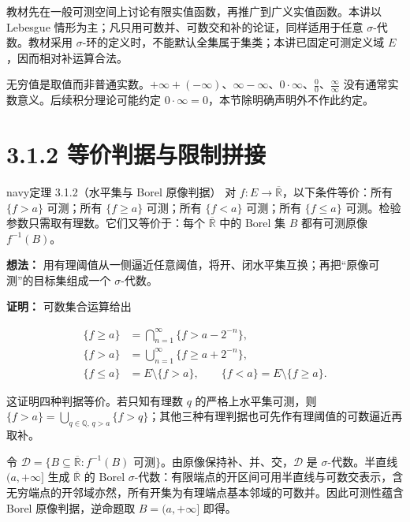 \documentclass[11pt,a4paper]{article}
\begin{document}
教材先在一般可测空间上讨论有限实值函数，再推广到广义实值函数。本讲以
Lebesgue 情形为主；凡只用可数并、可数交和补的论证，同样适用于任意
\(\sigma\)-代数。教材采用
\(\sigma\)-环的定义时，不能默认全集属于集类；本讲已固定可测定义域
\(E\)，因而相对补运算合法。

无穷值是取值而非普通实数。\(+\infty+(-\infty)\)、\(\infty-\infty\)、\(0\cdot\infty\)、\(\frac{0}{0}\)、\(\frac{\infty}{\infty}\)
没有通常实数意义。后续积分理论可能约定
\(0\cdot\infty=0\)，本节除明确声明外不作此约定。

\section[\S{}3.1.2
等价判据与限制拼接]{3.1.2
等价判据与限制拼接}\label{ux7b49ux4ef7ux5224ux636eux4e0eux9650ux5236ux62fcux63a5}

\begin{sboxenv}{navy}{定理 3.1.2（水平集与 Borel 原像判据）}
对 \(f:E\to\overline{\mathbb R}\)，以下条件等价：所有 \(\{f>a\}\)
可测；所有 \(\{f\ge a\}\) 可测；所有 \(\{f<a\}\) 可测；所有
\(\{f\le a\}\) 可测。检验参数只需取有理数。它们又等价于：每个
\(\overline{\mathbb R}\) 中的 Borel 集 \(B\) 都有可测原像
\(f^{-1}(B)\)。

\end{sboxenv}

\textbf{想法：}
用有理阈值从一侧逼近任意阈值，将开、闭水平集互换；再把``原像可测''的目标集组成一个
\(\sigma\)-代数。

\textbf{证明：} 可数集合运算给出

\begin{equation*}
\begin{aligned}
\{f\ge a\}&=\bigcap_{n=1}^{\infty}\{f>a-2^{-n}\},\\
\{f>a\}&=\bigcup_{n=1}^{\infty}\{f\ge a+2^{-n}\},\\
\{f\le a\}&=E\setminus\{f>a\},\qquad
\{f<a\}=E\setminus\{f\ge a\}.
\end{aligned}
\tag{3.1.1}
\end{equation*}

这证明四种判据等价。若只知有理数 \(q\) 的严格上水平集可测，则
\(\{f>a\}=\bigcup_{q\in\mathbb Q,\,q>a}\{f>q\}\)；其他三种有理判据也可先作有理阈值的可数逼近再取补。

令
\(\mathcal D=\{B\subseteq\overline{\mathbb R}:f^{-1}(B)\text{ 可测}\}\)。由原像保持补、并、交，\(\mathcal D\)
是 \(\sigma\)-代数。半直线 \((a,+\infty]\) 生成 \(\overline{\mathbb R}\)
的 Borel
\(\sigma\)-代数：有限端点的开区间可用半直线与可数交表示，含无穷端点的开邻域亦然，所有开集为有理端点基本邻域的可数并。因此可测性蕴含
Borel 原像判据，逆命题取 \(B=(a,+\infty]\) 即得。
\end{document}
